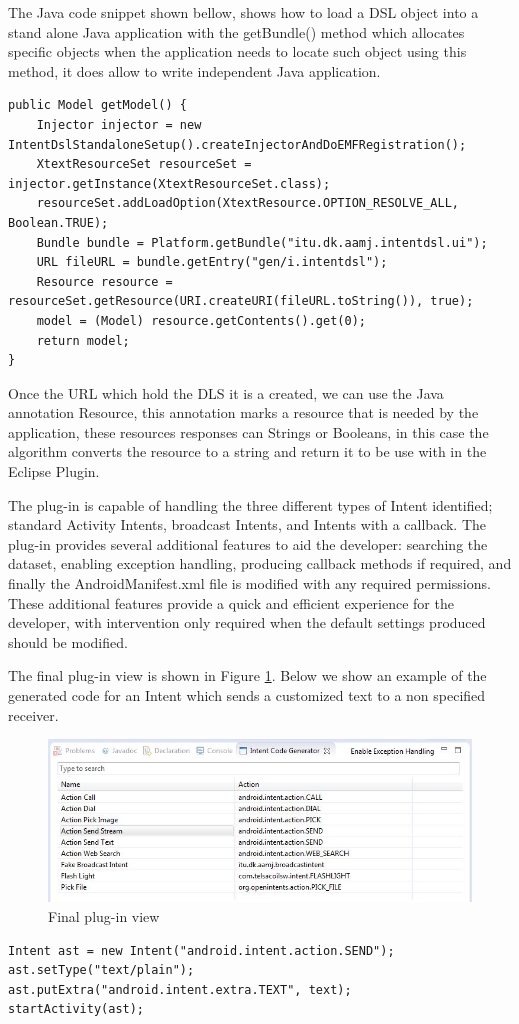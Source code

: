 The Java code snippet shown bellow, shows how to load a DSL object into a stand alone Java application with the getBundle() method which allocates specific objects when the application needs to locate such object using this method, it does allow to write independent Java application.

{\footnotesize\begin{lstlisting}
public Model getModel() {
	Injector injector = new IntentDslStandaloneSetup().createInjectorAndDoEMFRegistration();
	XtextResourceSet resourceSet = injector.getInstance(XtextResourceSet.class);
	resourceSet.addLoadOption(XtextResource.OPTION_RESOLVE_ALL, Boolean.TRUE);
	Bundle bundle = Platform.getBundle("itu.dk.aamj.intentdsl.ui");
	URL fileURL = bundle.getEntry("gen/i.intentdsl");
	Resource resource = resourceSet.getResource(URI.createURI(fileURL.toString()), true);
	model = (Model) resource.getContents().get(0);
	return model;
}
\end{lstlisting}}

Once the URL which hold the DLS it is a created, we can use the Java annotation Resource, this annotation marks a resource that is needed by the application, these resources responses can Strings or Booleans, in this case the algorithm converts the resource to a string and return it to be use with in the Eclipse Plugin. 
 
The plug-in is capable of handling the three different types of Intent identified; standard Activity Intents, broadcast Intents, and Intents with a callback. The plug-in provides several additional features to aid the developer: searching the dataset, enabling exception handling, producing callback methods if required, and finally the AndroidManifest.xml file is modified with any required permissions. These additional features provide a quick and efficient experience for the developer, with intervention only required when the default settings produced should be modified.

The final plug-in view is shown in Figure \ref{codegeneratorview}. Below we show an example of the generated code for an Intent which sends a customized text to a non specified receiver.

\begin{figure}[t]
\label{codegeneratorview}
  \centering
    \includegraphics[width=\textwidth]{codegenerator}
  \caption{Final plug-in view}
\end{figure}

{\footnotesize\begin{lstlisting}
Intent ast = new Intent("android.intent.action.SEND");
ast.setType("text/plain");
ast.putExtra("android.intent.extra.TEXT", text);
startActivity(ast);		
\end{lstlisting}}